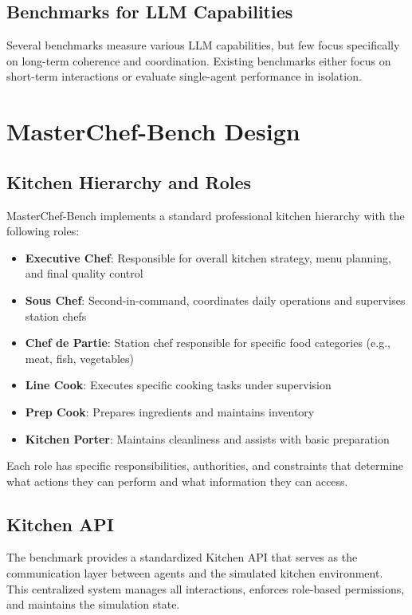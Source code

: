 \documentclass{article}
\begin{document}
\subsection{Benchmarks for LLM Capabilities}
Several benchmarks measure various LLM capabilities, but few focus specifically on long-term coherence and coordination. Existing benchmarks either focus on short-term interactions or evaluate single-agent performance in isolation.

\section{MasterChef-Bench Design}
\label{sec:design}

\subsection{Kitchen Hierarchy and Roles}

MasterChef-Bench implements a standard professional kitchen hierarchy with the following roles:

\begin{itemize}
    \item \textbf{Executive Chef}: Responsible for overall kitchen strategy, menu planning, and final quality control
    \item \textbf{Sous Chef}: Second-in-command, coordinates daily operations and supervises station chefs
    \item \textbf{Chef de Partie}: Station chef responsible for specific food categories (e.g., meat, fish, vegetables)
    \item \textbf{Line Cook}: Executes specific cooking tasks under supervision
    \item \textbf{Prep Cook}: Prepares ingredients and maintains inventory
    \item \textbf{Kitchen Porter}: Maintains cleanliness and assists with basic preparation
\end{itemize}

Each role has specific responsibilities, authorities, and constraints that determine what actions they can perform and what information they can access.

\subsection{Kitchen API}
The benchmark provides a standardized Kitchen API that serves as the communication layer between agents and the simulated kitchen environment. This centralized system manages all interactions, enforces role-based permissions, and maintains the simulation state.
\end{document}
